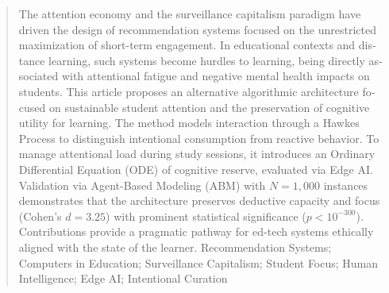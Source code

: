\documentclass[english, spanish, brazilian]{RBIEarticle}
\begin{document}
\begin{otherlanguage}{english}
\begin{abstract}
The attention economy and the surveillance capitalism paradigm have driven the design of recommendation systems focused on the unrestricted maximization of short-term engagement. In educational contexts and distance learning, such systems become hurdles to learning, being directly associated with attentional fatigue and negative mental health impacts on students. This article proposes an alternative algorithmic architecture focused on sustainable student attention and the preservation of cognitive utility for learning. The method models interaction through a Hawkes Process to distinguish intentional consumption from reactive behavior. To manage attentional load during study sessions, it introduces an Ordinary Differential Equation (ODE) of cognitive reserve, evaluated via Edge AI. Validation via Agent-Based Modeling (ABM) with $N=1{,}000$ instances demonstrates that the architecture preserves deductive capacity and focus (Cohen's $d = 3.25$) with prominent statistical significance ($p < 10^{-300}$). Contributions provide a pragmatic pathway for ed-tech systems ethically aligned with the state of the learner.
\keywords Recommendation Systems; Computers in Education; Surveillance Capitalism; Student Focus; Human Intelligence; Edge AI; Intentional Curation
\end{abstract}
\end{otherlanguage}
\end{document}
